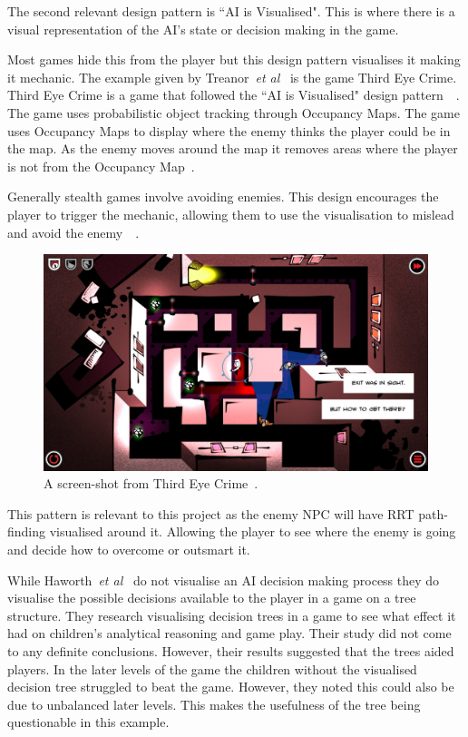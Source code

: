 \documentclass[journal]{IEEEtran}
\begin{document}
The second relevant design pattern is ``AI is Visualised".  This is where there is a visual representation of the AI's state or decision making in the game. 

Most games hide this from the player but this design pattern visualises it making it mechanic.  
The example given by Treanor~\textit{et al}~\cite{treanor2015} is the game Third Eye Crime.  Third Eye Crime is a game that followed the ``AI is Visualised" design pattern~\cite{Isla2014}~\cite{game:ThirdEyeCrime}.  
The game uses probabilistic object tracking through Occupancy Maps. The game uses Occupancy Maps to display where the enemy thinks the player could be in the map. As the enemy moves around the map it removes areas where the player is not from the Occupancy Map~\cite{Isla2014}.  

Generally stealth games involve avoiding enemies.  This design encourages the player to trigger the mechanic,  allowing them to use the visualisation to mislead and avoid the enemy~\cite{Isla2014}~\cite{game:ThirdEyeCrime}. 

\begin{figure}[h]
	\includegraphics[width=1.0\linewidth]{ThirdEyeCrime.jpg}
	\caption{ A screen-shot from Third Eye Crime~\cite{game:ThirdEyeCrime}.}
	\label{image:ThirdEyeCrime}
\end{figure}  

This pattern is relevant to this project as the enemy NPC will have RRT path-finding visualised around it. Allowing the player to see where the enemy is going and decide how to overcome or outsmart it.

While Haworth~\textit{et al}~\cite{Haworth2010} do not visualise an AI decision making process they do visualise the possible decisions available to the player in a game on a tree structure.   They research visualising decision trees in a game to see what effect it had on children's analytical reasoning and game play.  
Their study did not come to any definite conclusions. However, their results suggested that the trees aided players. In the later levels of the game the children without the visualised decision tree struggled to beat the game.   However, they noted this could also be due to unbalanced later levels.  This makes the usefulness of the tree being questionable in this example.  
\end{document}
